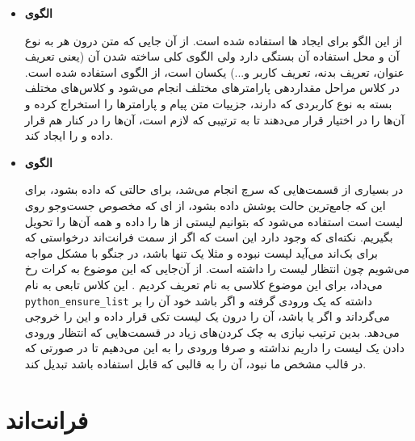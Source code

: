 \begin{itemize}
	\item
	\textbf{الگوی }
	
	از این الگو برای ایجاد  ها استفاده شده است. از آن جایی که متن درون هر  به نوع آن  و محل استفاده آن بستگی دارد ولی الگوی کلی ساخته شدن آن (یعنی تعریف عنوان، تعریف بدنه، تعریف کاربر و...) یکسان است، از الگوی  استفاده شده است. در کلاس  مراحل مقداردهی پارامترهای مختلف  انجام می‌شود و کلاس‌های مختلف  بسته به نوع کاربردی که دارند، جزییات متن پیام و پارامترها را استخراج کرده و آن‌‌ها را در اختیار  قرار می‌دهند تا به ترتیبی که لازم است، آن‌ها را در کنار هم قرار داده و  را ایجاد کند.
	
	
	\item
	\textbf{الگوی }
	
	در بسیاری از قسمت‌هایی که سرچ انجام می‌شد، برای حالتی که  داده بشود، برای این که جامع‌ترین حالت پوشش داده بشود، از  ای که مخصوص جست‌وجو روی لیست است استفاده می‌شود که بتوانیم لیستی از  ها را داده و همه آن‌ها را تحویل بگیریم. نکته‌ای که وجود دارد این است که اگر از سمت فرانت‌اند درخواستی که برای بک‌اند می‌آید لیست نبوده و مثلا یک  تنها باشد، در  جنگو با مشکل مواجه می‌شویم چون انتظار لیست را داشته است. از آن‌جایی که این موضوع به کرات رخ می‌داد، برای این موضوع کلاسی به نام  تعریف کردیم . این کلاس تابعی به نام \verb+python_ensure_list+  داشته که یک ورودی گرفته و اگر  باشد خود آن را بر می‌گرداند و اگر  یا  باشد، آن‌ را درون یک لیست تکی قرار داده و این  را خروجی می‌دهد. بدین ترتیب نیازی به چک کردن‌های زیاد در قسمت‌هایی که انتظار ورودی دادن یک لیست را داریم نداشته و صرفا ورودی را به این  می‌دهیم تا در صورتی که در قالب مشخص ما نبود، آن را به قالبی که قابل استفاده باشد تبدیل کند.
	
	
	
\end{itemize}

\newpage

\section{فرانت‌اند}
\label{designpattern:front}


